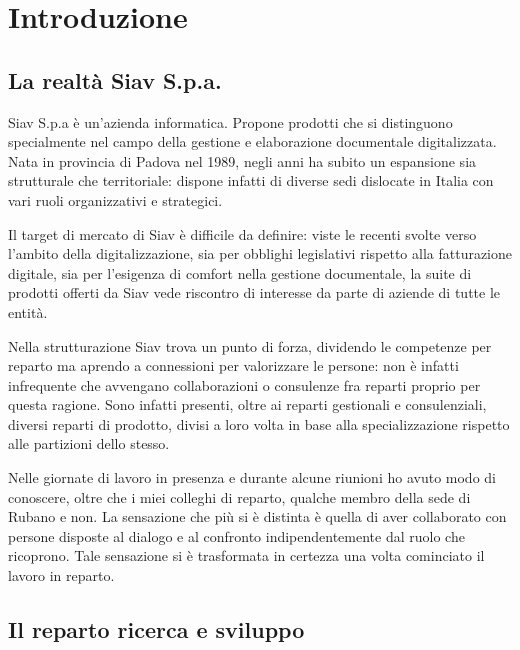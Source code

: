 
\chapter{Introduzione}
\label{cap:introduzione}
\section{La realtà Siav S.p.a.}
Siav S.p.a è un'azienda informatica. Propone prodotti che si distinguono specialmente nel campo della gestione e elaborazione documentale digitalizzata. Nata in provincia di Padova nel 1989, negli anni ha subito un espansione sia strutturale che territoriale: dispone infatti di diverse sedi dislocate in Italia con vari ruoli organizzativi e strategici.

Il target di mercato di Siav è difficile da definire: viste le recenti svolte verso l'ambito della digitalizzazione, sia per obblighi legislativi rispetto alla fatturazione digitale, sia per l'esigenza di comfort nella gestione documentale, la suite di prodotti offerti da Siav vede riscontro di interesse da parte di aziende di tutte le entità.

Nella strutturazione Siav trova un punto di forza, dividendo le competenze per reparto ma aprendo a connessioni per valorizzare le persone: non è infatti infrequente che avvengano collaborazioni o consulenze fra reparti proprio per questa ragione. Sono infatti presenti, oltre ai reparti gestionali e consulenziali, diversi reparti di prodotto, divisi a loro volta in base alla specializzazione rispetto alle partizioni dello stesso.

Nelle giornate di lavoro in presenza e durante alcune riunioni ho avuto modo di conoscere, oltre che i miei colleghi di reparto, qualche membro della sede di Rubano e non. La sensazione che più si è distinta è quella di aver collaborato con persone disposte al dialogo e al confronto indipendentemente dal ruolo che ricoprono. Tale sensazione si è trasformata in certezza una volta cominciato il lavoro in reparto.


\section{Il reparto ricerca e sviluppo}

